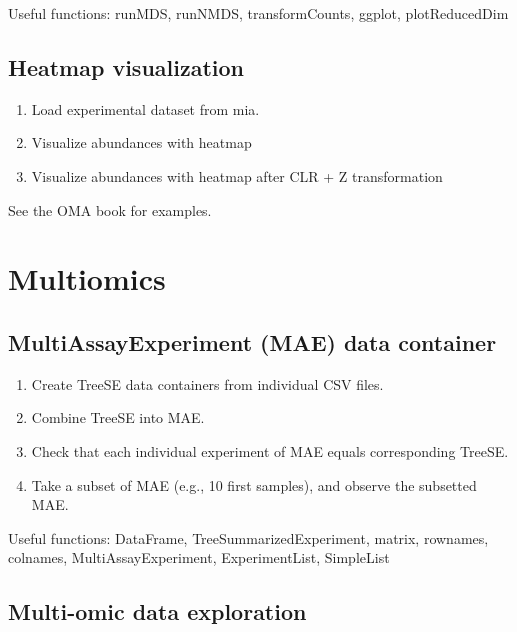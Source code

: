 \documentclass[
]{book}
\providecommand{\tightlist}{%
  \setlength{\itemsep}{0pt}\setlength{\parskip}{0pt}}
\begin{document}
Useful functions: runMDS, runNMDS, transformCounts, ggplot, plotReducedDim

\hypertarget{heatmap-visualization}{%
\subsection{Heatmap visualization}\label{heatmap-visualization}}

\begin{enumerate}
\def\labelenumi{\arabic{enumi}.}
\tightlist
\item
  Load experimental dataset from mia.
\item
  Visualize abundances with heatmap
\item
  Visualize abundances with heatmap after CLR + Z transformation
\end{enumerate}

See the OMA book for examples.

\hypertarget{multiomics}{%
\section{Multiomics}\label{multiomics}}

\hypertarget{multiassayexperiment-mae-data-container}{%
\subsection{MultiAssayExperiment (MAE) data container}\label{multiassayexperiment-mae-data-container}}

\begin{enumerate}
\def\labelenumi{\arabic{enumi}.}
\tightlist
\item
  Create TreeSE data containers from individual CSV files.
\item
  Combine TreeSE into MAE.
\item
  Check that each individual experiment of MAE equals corresponding TreeSE.
\item
  Take a subset of MAE (e.g., 10 first samples), and observe the subsetted MAE.
\end{enumerate}

Useful functions: DataFrame, TreeSummarizedExperiment, matrix, rownames, colnames, MultiAssayExperiment, ExperimentList, SimpleList

\hypertarget{multi-omic-data-exploration}{%
\subsection{Multi-omic data exploration}\label{multi-omic-data-exploration}}
\end{document}

